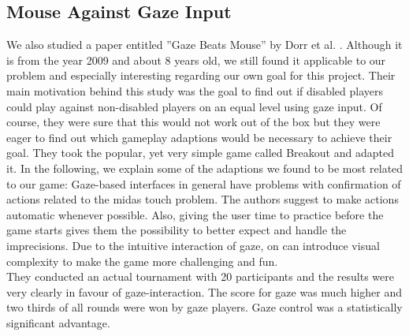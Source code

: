 \documentclass{sigchi}
\begin{document}
\subsection{Mouse Against Gaze Input}
We also studied a paper entitled ''Gaze Beats Mouse'' by Dorr et al. \cite{dorr2009gaze}. Although it is from the year 2009 and about 8 years old, we still found it applicable to our problem and especially interesting regarding our own goal for this project. Their main motivation behind this study was the goal to find out if disabled players could play against non-disabled players on an equal level using gaze input. Of course, they were sure that this would not work out of the box but they were eager to find out which gameplay adaptions would be necessary to achieve their goal. They took the popular, yet very simple game called Breakout and adapted it. In the following, we explain some of the adaptions we found to be most related to our game: Gaze-based interfaces in general have problems with confirmation of actions related to the midas touch problem. The authors suggest to make actions automatic whenever possible. Also, giving the user time to practice before the game starts gives them the possibility to better expect and handle the imprecisions. Due to the intuitive interaction of gaze, on can introduce visual complexity to make the game more challenging and fun.\\
They conducted an actual tournament with 20 participants and the results were very clearly in favour of gaze-interaction. The score for gaze was much higher and two thirds of all rounds were won by gaze players. Gaze control was a statistically significant advantage.
\end{document}
